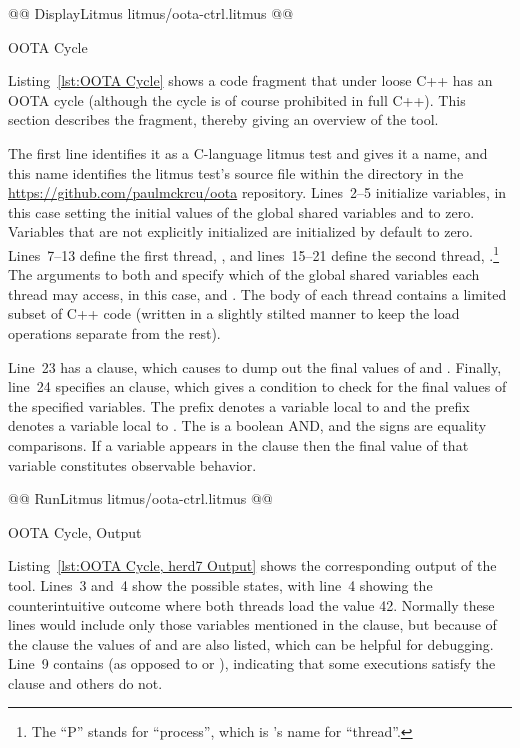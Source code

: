 \documentclass[10]{article}
\begin{document}
\begin{listing}[tbp]
@@ DisplayLitmus litmus/oota-ctrl.litmus @@
\caption{OOTA Cycle}
\label{lst:OOTA Cycle}
\end{listing}

Listing~\ref{lst:OOTA Cycle}
shows a code fragment that under loose C++ has an OOTA cycle (although
the cycle is of course prohibited in full C++).
This section describes the fragment, thereby giving an overview of
the  tool.

The first line identifies it as a C-language litmus test and gives it
a name, and this name identifies the litmus test's source file within
the  directory in the \url{https://github.com/paulmckrcu/oota}
repository.
Lines~2--5 initialize variables, in this case setting the initial
values of the global shared variables  and  to zero.
Variables that are not explicitly initialized are initialized by
default to zero.
Lines~7--13 define the first thread, , and lines~15--21
define the second thread, .\footnote{
	The ``P'' stands for ``process'', which is 's name
	for ``thread''.}
The arguments to both  and  specify which of
the global shared variables each thread may access, in this case, 
and .
The body of each thread contains a limited subset of C++ code
(written in a slightly stilted manner to keep the load operations separate
from the rest).

Line~23 has a  clause, which causes
 to dump out the final values of  and .
Finally, line~24 specifies an  clause, which gives a
condition to check for the final values of the specified variables.
The  prefix denotes a variable local to  and
the  prefix denotes a variable local to .
The \co{/\\} is a boolean AND, and the \co{=} signs are equality comparisons.
If a variable appears in the  clause then the final value of
that variable constitutes observable behavior.

\begin{listing}[tbp]
@@ RunLitmus litmus/oota-ctrl.litmus @@
\caption{OOTA Cycle,  Output}
\label{lst:OOTA Cycle, herd7 Output}
\end{listing}

Listing~\ref{lst:OOTA Cycle, herd7 Output} shows the corresponding output
of the  tool.
Lines~3 and~4 show the possible states, with line~4 showing the
counterintuitive outcome where both threads load the value 42.
Normally these lines would include only those variables mentioned
in the  clause, but because of the  clause
the values of  and  are also listed, which
can be helpful for debugging.
Line~9 contains  (as opposed to  or ),
indicating that some executions satisfy the  clause and
others do not.
\end{document}
